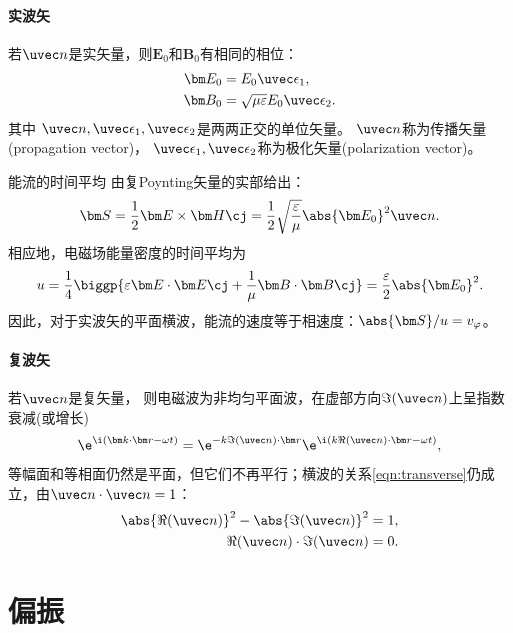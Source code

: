 \paragraph{实波矢}

若$\uvec n$是实矢量，则$\bm E_0$和$\bm B_0$有相同的相位：
\begin{subequations}
    \begin{align}
        \bm E_0&=E_0\uvec\epsilon_1,\\
        \bm B_0&=\sqrt{\mu\varepsilon}E_0\uvec\epsilon_2.
    \end{align}
\end{subequations}
其中
$\uvec n,\uvec\epsilon_1,\uvec\epsilon_2$是两两正交的单位矢量。
$\uvec n$称为传播矢量(propagation vector)，
$\uvec\epsilon_1,\uvec\epsilon_2$称为极化矢量(polarization vector)。

能流的时间平均%
由复Poynting矢量的实部给出：
\begin{equation}
    \bm S=\frac12\bm E\times\bm H\cj=\frac12\sqrt{\frac\varepsilon\mu}\abs{\bm E_0}^2\uvec n.
\end{equation}
相应地，电磁场能量密度的时间平均为
\begin{equation}
    u=\frac14\biggp{\varepsilon\bm E\cdot\bm E\cj+\frac1\mu\bm B\cdot\bm B\cj}=\frac\varepsilon 2\abs{\bm E_0}^2.
\end{equation}
因此，对于实波矢的平面横波，能流的速度等于相速度：$\abs{\bm S}/u=v_\varphi$。

\paragraph{复波矢}

若$\uvec n$是复矢量，
则电磁波为非均匀平面波，在虚部方向$\Im(\uvec n)$上呈指数衰减(或增长)
\[
    \e^{\i(\bm k\cdot\bm r-\omega t)}=\e^{-k\Im(\uvec n)\cdot\bm r}\e^{\i(k\Re(\uvec n)\cdot\bm r-\omega t)},
\]
等幅面和等相面仍然是平面，但它们不再平行；横波的关系\eqref{eqn:transverse}仍成立，由$\uvec n\cdot\uvec n=1$：
\begin{subequations}
    \begin{align}
        \abs{\Re(\uvec n)}^2-\abs{\Im(\uvec n)}^2&=1,\\
        \Re(\uvec n)\cdot\Im(\uvec n)&=0.
    \end{align}
\end{subequations}

\section{偏振}

